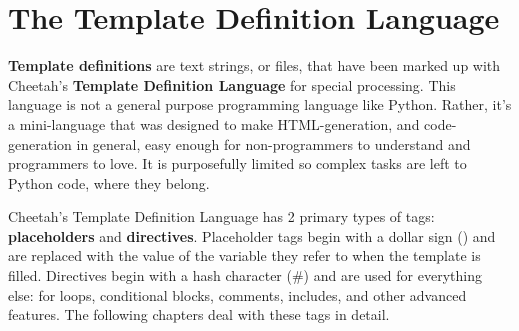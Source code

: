 \section{The Template Definition Language}



{\bf Template definitions} are text strings, or files, that have been marked up
with Cheetah's {\bf Template Definition Language} for special processing.  This
language is not a general purpose programming language like Python.  Rather,
it's a mini-language that was designed to make HTML-generation, and
code-generation in general, easy enough for non-programmers to understand and
programmers to love.  It is purposefully limited so complex tasks are left to
Python code, where they belong.

Cheetah's Template Definition Language has 2 primary types of tags: {\bf
  placeholders} and {\bf directives}. Placeholder tags begin with a dollar sign
() and are replaced with the value of the variable they refer to
when the template is filled. Directives begin with a hash character (\#) and are
used for everything else: for loops, conditional blocks, comments, includes, and
other advanced features. The following chapters deal with these tags in detail.

